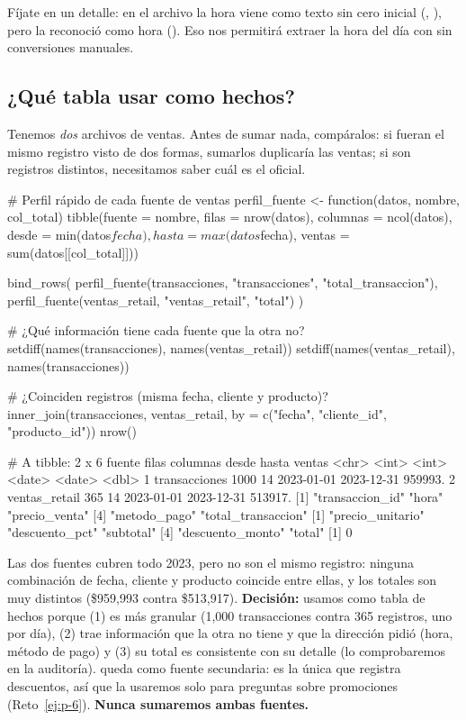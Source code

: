Fíjate en un detalle: en el archivo la hora viene como texto sin cero
inicial (, ), pero  la
reconoció como hora (). Eso nos permitirá extraer la hora del
día con  sin conversiones manuales.

\subsection{¿Qué tabla usar como hechos?}
\label{sec:m09-fuente}

Tenemos \emph{dos} archivos de ventas. Antes de sumar nada, compáralos: si
fueran el mismo registro visto de dos formas, sumarlos duplicaría las ventas;
si son registros distintos, necesitamos saber cuál es el oficial.

\begin{rcode}
# Perfil rápido de cada fuente de ventas
perfil_fuente <- function(datos, nombre, col_total) {
  tibble(fuente   = nombre,
         filas    = nrow(datos),
         columnas = ncol(datos),
         desde    = min(datos$fecha),
         hasta    = max(datos$fecha),
         ventas   = sum(datos[[col_total]]))
}

bind_rows(
  perfil_fuente(transacciones, "transacciones", "total_transaccion"),
  perfil_fuente(ventas_retail, "ventas_retail", "total")
)

# ¿Qué información tiene cada fuente que la otra no?
setdiff(names(transacciones), names(ventas_retail))
setdiff(names(ventas_retail), names(transacciones))

# ¿Coinciden registros (misma fecha, cliente y producto)?
inner_join(transacciones, ventas_retail,
           by = c("fecha", "cliente_id", "producto_id")) %
  nrow()
\end{rcode}

\begin{rsalida}
# A tibble: 2 x 6
  fuente        filas columnas desde      hasta       ventas
  <chr>         <int>    <int> <date>     <date>       <dbl>
1 transacciones  1000       14 2023-01-01 2023-12-31 959993.
2 ventas_retail   365       14 2023-01-01 2023-12-31 513917.
[1] "transaccion_id"    "hora"              "precio_venta"     
[4] "metodo_pago"       "total_transaccion"
[1] "precio_unitario" "descuento_pct"   "subtotal"       
[4] "descuento_monto" "total"          
[1] 0
\end{rsalida}

Las dos fuentes cubren todo 2023, pero no son el mismo registro: ninguna
combinación de fecha, cliente y producto coincide entre ellas, y los totales
son muy distintos (\$959,993 contra \$513,917). \textbf{Decisión:} usamos
 como tabla de hechos porque (1) es más granular
(1,000 transacciones contra 365 registros, uno por día), (2) trae
información que la otra no tiene y que la dirección pidió (hora, método de
pago) y (3) su total es consistente con su detalle (lo comprobaremos en la
auditoría).  queda como fuente secundaria: es la
única que registra descuentos, así que la usaremos solo para preguntas sobre
promociones (Reto~\ref{ej:p-6}). \textbf{Nunca sumaremos ambas fuentes.}

